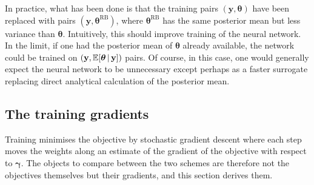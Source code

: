 In practice, what has been done is that the training pairs $(\mathbf{y}, \bm{\theta})$ have been replaced with pairs $(\mathbf{y}, \bm{\theta}^{\mathrm{RB}})$, where $\bm{\theta}^{\mathrm{RB}}$ has the same posterior mean but less variance than $\bm{\theta}$. Intuitively, this should improve training of the neural network. In the limit, if one had the posterior mean of $\bm{\theta}$ already available, the network could be trained on $(\mathbf{y}, \mathbb{E}[\bm{\theta} \,|\, \mathbf{y}])$ pairs. Of course, in this case, one would generally expect the neural network to be unnecessary except perhaps as a faster surrogate replacing direct analytical calculation of the posterior mean.

\subsection{The training gradients}
\label{sec:gradients}

Training minimises the objective by stochastic gradient descent
where each step moves the weights along
an estimate of the gradient of the objective with respect to
$\bm{\gamma}$. The objects to compare between the two schemes are
therefore not the objectives themselves but their gradients, and this
section derives them.


